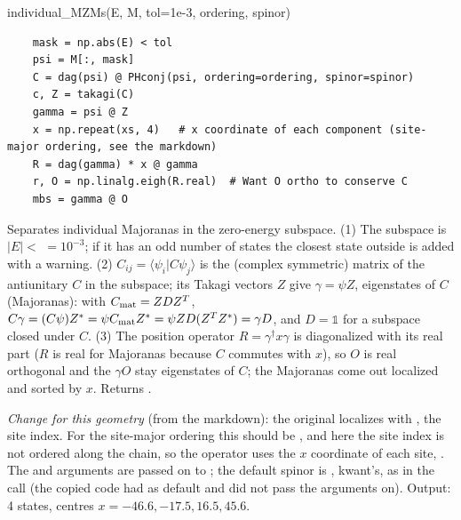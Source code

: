 \begin{function}{individual\_MZMs(E, M, tol=1e-3, ordering, spinor)}
\begin{Verbatim}
    mask = np.abs(E) < tol
    psi = M[:, mask]
    C = dag(psi) @ PHconj(psi, ordering=ordering, spinor=spinor)
    c, Z = takagi(C)
    gamma = psi @ Z
    x = np.repeat(xs, 4)   # x coordinate of each component (site-major ordering, see the markdown)
    R = dag(gamma) * x @ gamma
    r, O = np.linalg.eigh(R.real)  # Want O ortho to conserve C
    mbs = gamma @ O
\end{Verbatim}
Separates individual Majoranas in the zero-energy subspace. (1) The subspace is $|E| < $  $=10^{-3}$; if it has an odd number of
states the closest state outside is added with a warning. (2) $C_{ij} = \langle\psi_i|C\psi_j\rangle$ is the (complex symmetric) matrix of the
antiunitary $C$ in the subspace; its Takagi vectors $Z$ give $\gamma = \psi Z$, eigenstates of $C$ (Majoranas): with $C_{\rm mat}=ZDZ^T$,
$C\gamma=(C\psi)Z^*=\psi C_{\rm mat}Z^*=\psi ZD(Z^TZ^*)=\gamma D$, and $D=\mathbb 1$ for a subspace closed under $C$. (3) The position operator
$R = \gamma^\dagger x\gamma$ is diagonalized with its real part ($R$ is real for Majoranas because $C$ commutes with $x$), so $O$ is real orthogonal and the $\gamma O$ stay eigenstates of $C$; the
Majoranas come out localized and sorted by $x$. Returns .

\emph{Change for this geometry} (from the markdown): the original localizes with , the site index. For the
site-major ordering  this should be , and here the site index is not ordered along the chain, so the operator
uses the $x$ coordinate of each site, . The  and  arguments are passed on to ; the
default spinor is , kwant's, as in the call (the copied code had  as default and did not pass the arguments on). Output: 4 states, centres
$x = -46.6, -17.5, 16.5, 45.6$.
\end{function}


